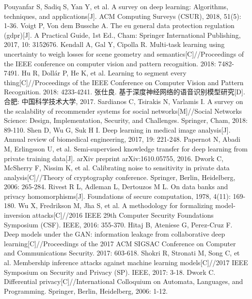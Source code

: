 \documentclass[12pt,openany,a4paper,fancyhdr,oneside]{ctexbook}
\begin{document}
\begin{thebibliography}{99}

Pouyanfar S, Sadiq S, Yan Y, et al. A survey on deep learning: Algorithms, techniques, and applications[J]. ACM Computing Surveys (CSUR), 2018, 51(5): 1-36.
Voigt P, Von dem Bussche A. The eu general data protection regulation (gdpr)[J]. A Practical Guide, 1st Ed., Cham: Springer International Publishing, 2017, 10: 3152676.
Kendall A, Gal Y, Cipolla R. Multi-task learning using uncertainty to weigh losses for scene geometry and semantics[C]//Proceedings of the IEEE conference on computer vision and pattern recognition. 2018: 7482-7491.
Hu R, Dollár P, He K, et al. Learning to segment every thing[C]//Proceedings of the IEEE Conference on Computer Vision and Pattern Recognition. 2018: 4233-4241.
张仕良. 基于深度神经网络的语音识别模型研究[D]. 合肥: 中国科学技术大学, 2017.
Sardianos C, Tsirakis N, Varlamis I. A survey on the scalability of recommender systems for social networks[M]//Social Networks Science: Design, Implementation, Security, and Challenges. Springer, Cham, 2018: 89-110.
Shen D, Wu G, Suk H I. Deep learning in medical image analysis[J]. Annual review of biomedical engineering, 2017, 19: 221-248.
Papernot N, Abadi M, Erlingsson U, et al. Semi-supervised knowledge transfer for deep learning from private training data[J]. arXiv preprint arXiv:1610.05755, 2016.
Dwork C, McSherry F, Nissim K, et al. Calibrating noise to sensitivity in private data analysis[C]//Theory of cryptography conference. Springer, Berlin, Heidelberg, 2006: 265-284.
Rivest R L, Adleman L, Dertouzos M L. On data banks and privacy homomorphisms[J]. Foundations of secure computation, 1978, 4(11): 169-180.
Wu X, Fredrikson M, Jha S, et al. A methodology for formalizing model-inversion attacks[C]//2016 IEEE 29th Computer Security Foundations Symposium (CSF). IEEE, 2016: 355-370.
Hitaj B, Ateniese G, Perez-Cruz F. Deep models under the GAN: information leakage from collaborative deep learning[C]//Proceedings of the 2017 ACM SIGSAC Conference on Computer and Communications Security. 2017: 603-618.
Shokri R, Stronati M, Song C, et al. Membership inference attacks against machine learning models[C]//2017 IEEE Symposium on Security and Privacy (SP). IEEE, 2017: 3-18.
Dwork C. Differential privacy[C]//International Colloquium on Automata, Languages, and Programming. Springer, Berlin, Heidelberg, 2006: 1-12.

\end{thebibliography}
\end{document}
